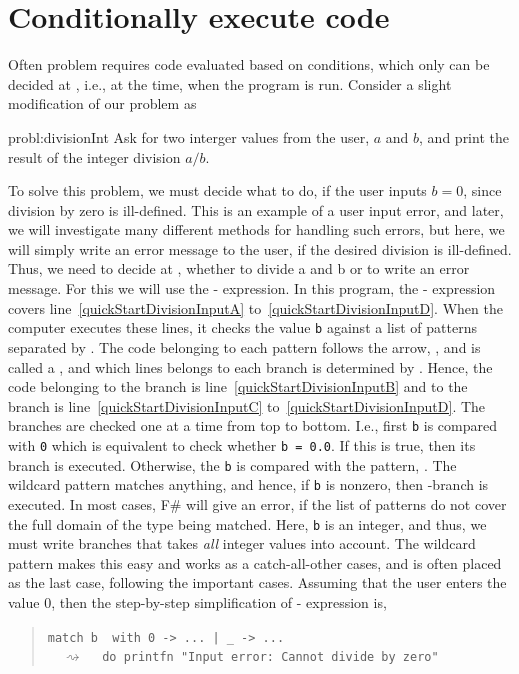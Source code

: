 \documentclass[fsharpNotes.tex]{subfiles}
\begin{document}
\section{Conditionally execute code}
Often problem requires code evaluated based on conditions, which only can be decided at , i.e., at the time, when the program is run. Consider a slight modification of our problem as
%
\begin{task}{probl:divisionInt}
  Ask for two interger values from the user, $a$ and $b$, and print the result of the integer division $a/b$.
\end{task}
%
To solve this problem, we must decide what to do, if the user inputs $b=0$, since division by zero is ill-defined. This is an example of a user input error, and later, we will investigate many different methods for handling such errors, but here, we will simply write an error message to the user, if the desired division is ill-defined. Thus, we need to decide at , whether to divide a and b or to write an error message. For this we will use the - expression.   
% 
%
In this program, the - expression covers line~\ref{quickStartDivisionInputA} to~\ref{quickStartDivisionInputD}. When the computer executes these lines, it checks the value \lstinline{b} against a list of  patterns separated by \lexeme{|}. The code belonging to each pattern follows the arrow, \lexeme{->}, and is called a , and which lines belongs to each branch is determined by . Hence, the code belonging to the  branch is line~\ref{quickStartDivisionInputB} and to the \lexeme{_} branch is line~\ref{quickStartDivisionInputC} to~\ref{quickStartDivisionInputD}. The branches are checked one at a time from top to bottom. I.e., first \lstinline{b} is compared with \lstinline{0} which is equivalent to check whether \lstinline{b = 0.0}. If this is true, then its branch is executed. Otherwise, the \lstinline{b} is compared with the  pattern, \lexeme{_}. The wildcard pattern matches anything, and hence, if \lstinline{b} is nonzero, then \lexeme{_}-branch is executed. In most cases, F\# will give an error, if the list of patterns do not cover the full domain of the type being matched. Here, \lstinline{b} is an integer, and thus, we must write branches that takes \emph{all} integer values into account. The wildcard pattern makes this easy and works as a catch-all-other cases, and is often placed as the last case, following the important cases. Assuming that the user enters the value 0, then the step-by-step simplification of - expression is, 
\begin{quote}
  \lstinline{match b  with 0 -> ... | _ -> ...}\\ $\quad\rightsquigarrow\quad$ \lstinline{do printfn "Input error: Cannot divide by zero"}
\end{quote}
\end{document}
